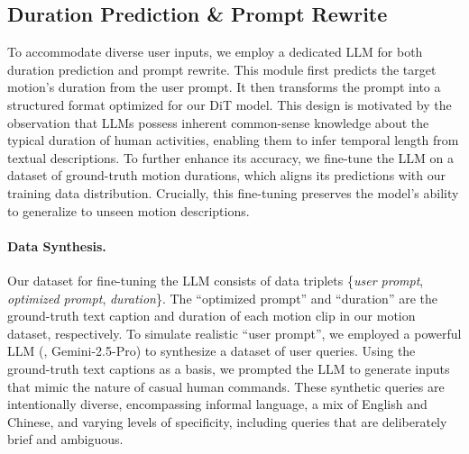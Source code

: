 \subsection{Duration Prediction \& Prompt Rewrite}
\label{subsec:pipeline_enhancement}

To accommodate diverse user inputs, we employ a dedicated LLM for both duration prediction and prompt rewrite. This module first predicts the target motion's duration from the user prompt. It then transforms the prompt into a structured format optimized for our DiT model. This design is motivated by the observation that LLMs possess inherent common-sense knowledge about the typical duration of human activities, enabling them to infer temporal length from textual descriptions. To further enhance its accuracy, we fine-tune the LLM on a dataset of ground-truth motion durations, which aligns its predictions with our training data distribution. Crucially, this fine-tuning preserves the model's ability to generalize to unseen motion descriptions.


\paragraph{Data Synthesis.}
Our dataset for fine-tuning the LLM consists of data triplets \{\textit{user prompt}, \textit{optimized prompt}, \textit{duration}\}. The ``optimized prompt'' and ``duration'' are the ground-truth text caption and duration of each motion clip in our motion dataset, respectively.
To simulate realistic ``user prompt'', we employed a powerful LLM (\eg, Gemini-2.5-Pro) to synthesize a dataset of user queries. Using the ground-truth text captions as a basis, we prompted the LLM to generate inputs that mimic the nature of casual human commands. These synthetic queries are intentionally diverse, encompassing informal language, a mix of English and Chinese, and varying levels of specificity, including queries that are deliberately brief and ambiguous.



